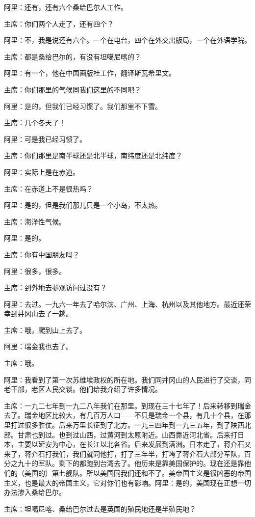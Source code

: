 阿里：还有，还有六个桑给巴尔人工作。

主席：你们两个人走了，还有四个？

阿里：不，我是说还有六个。一个在电台，四个在外交出版局，一个在外语学院。

主席：都是桑给巴尔的，有没有坦噶尼喀的？

阿里：有一个，他在中国画版社工作，翻译斯瓦希里文。

主席：你们那里的气候同我们这里的不同吧？

阿里：是的，但我们已经习惯了。我们那里不下雪。

主席：几个冬天了！

阿里：可是我已经习惯了。

主席：你们那里是南半球还是北半球，南纬度还是北纬度？

阿里：实际上是在赤道。

主席：在赤道上不是很热吗？

阿里：是的，但是我们那儿只是一个小岛，不太热。

主席：海洋性气候。

阿里：是的。

主席：你有中国朋友吗？

阿里：很多，很多。

主席：到外地去参观访问过没有？

阿里：去过。一九六一年去了哈尔滨、广州、上海、杭州以及其他地方。最近还荣幸到井冈山去了一趟。

主席：哦，爬到山上去了。

阿里：瑞金我也去了。

主席：哦。

阿里：我看到了第一次苏维埃政权的所在地。我们同井冈山的人民进行了交谈，同老干部，老区人民交谈。他们给我介绍了许多情况。

主席：一九二七年到一九二八年我们在那里。到现在三十七年了！后来转移到瑞金去了。瑞金地区比较大，有几百万人口——不只是瑞金一个县，有几十个县，在那里打过很多胜仗。后来万里长征到了北方。一九三四年到一九三五年，到了陕西北部。甘肃也到过。也到过山西，过黄河到太原附近。山西靠近河北省。后来打日本，主要以延安为中心，在长江以北各省。后来发展到满洲。日本走了，蒋介石又来了，蒋介石打我们，我们就同他打，打了三年半，打垮了蒋介石大部分军队，百分之九十的军队。剩下的都跑到台湾去了。他历来是靠美国保护的。现在还是靠他们的（美国的）第七舰队。所以美国同我们还和不了。美帝国主义是很凶恶的帝国主义，也是最大的帝国主义，它对你们也有影响。阿里：是的，美国现在正想一切办法渗入桑给巴尔。

主席：坦噶尼喀、桑给巴尔过去是英国的殖民地还是半殖民地？

